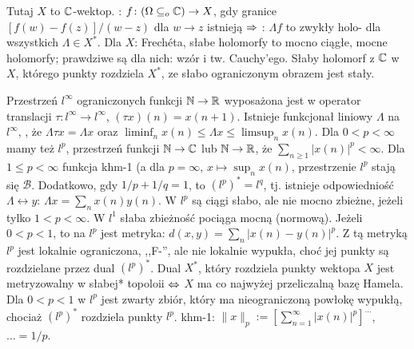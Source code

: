 Tutaj  $X$ to $\mathbb{C}$-wektop.
: $f \colon (\Omega \subseteq_o \mathbb{C}) \to X$, gdy granice $[f(w) - f(z)]{/}(w-z)$ dla $w \to z$ istnieją $\Rightarrow$ : $\Lambda f$ to zwykły holo- dla wszystkich $\Lambda \in X^*$.
Dla $X$: Frechéta, słabe holomorfy to mocno ciągłe, mocne holomorfy; prawdziwe są dla nich: wzór i tw. Cauchy'ego.
Słaby holomorf z $\mathbb{C}$ w $X$, którego punkty rozdziela $X^*$, ze słabo ograniczonym obrazem jest stały.

Przestrzeń $l^\infty$ ograniczonych funkcji $\mathbb N \to \mathbb{R}$ wyposażona jest w operator translacji $\tau \colon l^\infty \to l^\infty$, $(\tau x)(n) = x(n+1)$.
Istnieje funkcjonał liniowy $\Lambda$ na $l^\infty$, , że $\Lambda \tau x = \Lambda x$ oraz $\liminf_n x(n) \le \Lambda x \le \limsup_n x(n)$.
Dla $0 < p < \infty$ mamy też $l^p$, przestrzeń funkcji $\mathbb N \to \mathbb{C}$ lub $\mathbb N \to \mathbb{R}$, że $\sum_{n \ge 1} |x(n)|^p < \infty$.
Dla $1 \le p < \infty$ funkcja khm-1 (a dla $p = \infty$, $x \mapsto \sup_n x(n)$, przestrzenie $l^p$ stają się $\mathscr B$.
Dodatkowo, gdy $1/p + 1/q = 1$, to $(l^p)^* = l^q$, tj. istnieje odpowiedniość $\Lambda \leftrightarrow y$: $\Lambda x = \sum_n x(n) y(n)$.
W $l^p$ są ciągi słabo, ale nie mocno zbieżne, jeżeli tylko $1 < p < \infty$.
W $l^1$ słaba zbieżność pociąga mocną (normową).
Jeżeli $0 < p < 1$, to na $l^p$ jest metryka: $d(x, y) = \sum_n |x(n) - y(n)|^p$.
Z tą metryką $l^p$ jest lokalnie ograniczona, ,,F-'', ale nie lokalnie wypukła, choć jej punkty są rozdzielane przez dual $(l^p)^*$.
Dual $X^*$, który rozdziela punkty wektopa $X$ jest metryzowalny w słabej* topoloii $\Leftrightarrow$ $X$ ma co najwyżej przeliczalną bazę Hamela.
Dla $0 < p < 1$ w $l^p$ jest zwarty zbiór, który ma nieograniczoną powłokę wypukłą, chociaż $(l^p)^*$ rozdziela punkty $l^p$.
\hfill khm-1: $\|x\|_p := \left[ \sum_{n = 1}^\infty |x(n)|^p \right]^{\ldots}$, $\ldots = 1/p$.
